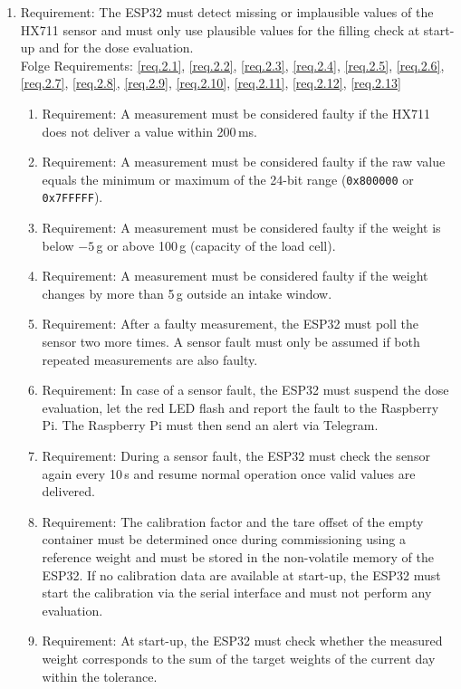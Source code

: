 \begin{enumerate}[label*=\arabic*.]
		\item \label{req.2} Requirement: The ESP32 must detect missing or implausible values of the HX711 sensor and must only use plausible values for the filling check at start-up and for the dose evaluation. \\
		Folge Requirements: \ref{req.2.1}, \ref{req.2.2}, \ref{req.2.3}, \ref{req.2.4}, \ref{req.2.5}, \ref{req.2.6}, \ref{req.2.7}, \ref{req.2.8}, \ref{req.2.9}, \ref{req.2.10}, \ref{req.2.11}, \ref{req.2.12}, \ref{req.2.13}
		\begin{enumerate}[label*=\arabic*.]
			\item \label{req.2.1} Requirement: A measurement must be considered faulty if the HX711 does not deliver a value within 200\,ms.
			\item \label{req.2.2} Requirement: A measurement must be considered faulty if the raw value equals the minimum or maximum of the 24-bit range
			(\texttt{0x800000} or \texttt{0x7FFFFF}).
			\item \label{req.2.3} Requirement: A measurement must be considered faulty if the weight is below $-5$\,g or above 100\,g (capacity of the load cell).
			\item \label{req.2.4} Requirement: A measurement must be considered faulty if the weight changes by more than 5\,g outside an intake window.
			\item \label{req.2.5} Requirement: After a faulty measurement, the ESP32 must poll the sensor two more times. A sensor fault must only be
			assumed if both repeated measurements are also faulty.
			\item \label{req.2.6} Requirement: In case of a sensor fault, the ESP32 must suspend the dose evaluation, let the red LED flash and report the
			fault to the Raspberry Pi. The Raspberry Pi must then send an alert via Telegram.
			\item \label{req.2.7} Requirement: During a sensor fault, the ESP32 must check the sensor again every 10\,s and resume normal operation once
			valid values are delivered.
			\item \label{req.2.8} Requirement: The calibration factor and the tare offset of the empty container must be determined once during commissioning using a reference weight and must be stored in the non-volatile memory of the ESP32. If no calibration data are available at start-up, the ESP32 must start the calibration via the serial interface and must not perform any evaluation.
			\item \label{req.2.9} Requirement: At start-up, the ESP32 must check whether the measured weight corresponds to the sum of the target weights of the current day within the tolerance.

\end{enumerate}
\end{enumerate}
